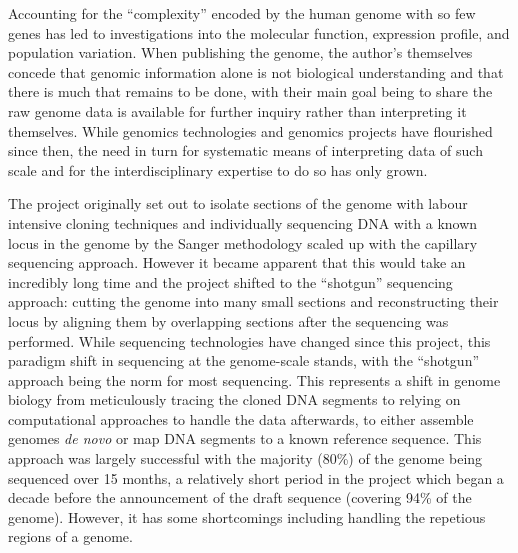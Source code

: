 Accounting for the ``complexity'' encoded by the human genome with so few genes has led to investigations into the molecular function, expression profile, and population variation. When publishing the genome, the author's themselves concede that genomic information alone is not biological understanding and that there is much that remains to be done, with their main goal being to share the raw genome data is available for further inquiry rather than interpreting it themselves. While genomics technologies and genomics projects have flourished since then, the need in turn for systematic means of interpreting data of such scale and for the interdisciplinary expertise to do so has only grown. 

The project originally set out to isolate sections of the genome with labour intensive cloning techniques and individually sequencing DNA with a known locus in the genome by the Sanger methodology scaled up with the capillary sequencing approach. However it became apparent that this would take an incredibly long time and the project shifted to the ``shotgun'' sequencing approach: cutting the genome into many small sections and reconstructing their locus by aligning them by overlapping sections after the sequencing was performed. While sequencing technologies have changed since this project, this paradigm shift in sequencing at the genome-scale stands, with the ``shotgun'' approach being the norm for most sequencing. This represents a shift in genome biology from meticulously tracing the cloned DNA segments to relying on computational approaches to handle the data afterwards, to either assemble genomes \textit{de novo} or map DNA segments to a known reference sequence. This approach was largely successful with the majority (80\%) of the genome being sequenced over 15 months, a relatively short period in the project which began a decade before the announcement of the draft sequence (covering 94\% of the genome). However, it has some shortcomings including handling the repetious regions of a genome.

